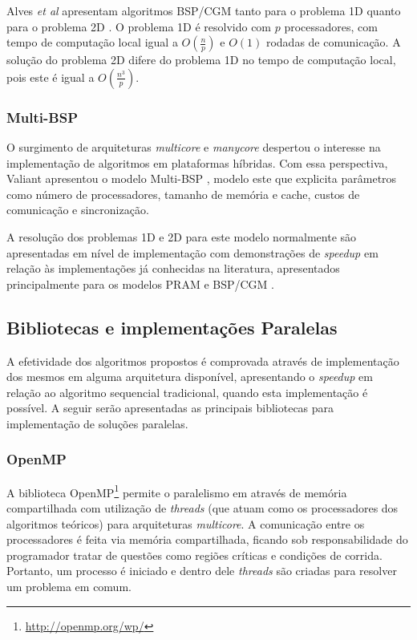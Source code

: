 \documentclass[a4paper, 12pt] {article}
\begin{document}
Alves \textit{et al} apresentam algoritmos BSP/CGM tanto para o problema 1D
quanto para o problema 2D \cite{alves2004}. O problema 1D é resolvido
com $p$ processadores, com tempo de computação local igual a  $O(\frac{n}{p})$ e $O(1)$
rodadas de comunicação. A solução do problema 2D difere do problema 1D no tempo
de computação local, pois este é igual a $O(\frac{n^3}{p})$.

\subsubsection{Multi-BSP}

O surgimento de arquiteturas \textit{multicore} e \textit{manycore} despertou o
interesse na implementação de algoritmos em plataformas
híbridas. Com essa perspectiva, Valiant apresentou o modelo Multi-BSP
\cite{Valiant:2008:BMM:1431008.1431011}, modelo este que explicita parâmetros
como número de processadores, tamanho de memória e cache, custos de comunicação
e sincronização.

A resolução dos problemas 1D e 2D para este modelo normalmente são apresentadas
em nível de implementação com demonstrações de \textit{speedup} em relação às
implementações já conhecidas na literatura, apresentados principalmente para os
modelos PRAM e BSP/CGM \cite{6473291,doi:10.1117/12.928318,takaoka2014efficient}.

\subsection{Bibliotecas e implementações Paralelas}

A efetividade dos algoritmos propostos é comprovada através de implementação dos
mesmos em alguma arquitetura disponível, apresentando o \textit{speedup} em
relação ao algoritmo sequencial tradicional, quando esta implementação é
possível. A seguir serão apresentadas as principais bibliotecas para
implementação de soluções paralelas.

\subsubsection{OpenMP}

A biblioteca OpenMP\footnote{\url{http://openmp.org/wp/}} permite o paralelismo
em através de memória compartilhada com utilização de \textit{threads} (que atuam
como os processadores dos algoritmos teóricos) para arquiteturas
\textit{multicore}. A comunicação entre os processadores é feita via memória
compartilhada, ficando sob responsabilidade do programador tratar de questões como regiões críticas e
condições de corrida. Portanto, um processo é iniciado e dentro dele
\textit{threads} são criadas para resolver um problema em comum.
\end{document}
